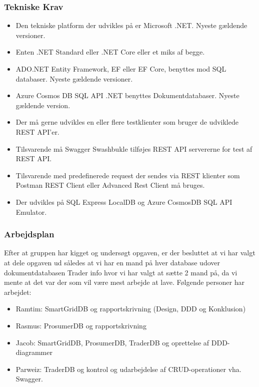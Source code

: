 \subsubsection{Tekniske Krav}

\begin{itemize}
    \item Den tekniske  platform der udvikles på er Microsoft .NET. Nyeste gældende versioner.
    \item Enten .NET Standard eller .NET Core eller et miks af begge. 
    \item ADO.NET Entity Framework, EF eller EF Core, benyttes mod SQL databaser. Nyeste gældende versioner.
    \item Azure Cosmos DB SQL API .NET benyttes Dokumentdatabaser. Nyeste gældende version.
    \item Der må gerne udvikles en eller flere testklienter som bruger de udviklede REST API'er.
    \item Tilsvarende må Swagger Swashbukle tilføjes REST API servererne for test af REST API.
    \item Tilsvarende med predefinerede request der sendes via REST klienter som Postman REST Client eller Advanced Rest Client må bruges.
    \item Der udvikles på SQL Express LocalDB og Azure CosmosDB SQL API Emulator.
\end{itemize}

\subsubsection{Arbejdsplan}

Efter at gruppen har kigget og undersøgt opgaven, er der besluttet at vi har valgt at dele opgaven ud således at vi har en mand på hver database udover dokumentdatabasen Trader info hvor vi har valgt at sætte 2 mand på, da vi mente at det var der som vil være mest arbejde at lave. Følgende personer har arbejdet:
\begin{itemize}
    \item Ramtim: SmartGridDB og rapportskrivning (Design, DDD og Konklusion)
    \item Rasmus: ProsumerDB og rapportskrivning
    \item Jacob: SmartGridDB, ProsumerDB, TraderDB og oprettelse af DDD-diagrammer
    \item Parweiz: TraderDB og kontrol og udarbejdelse af CRUD-operationer vha. Swagger.
\end{itemize}

